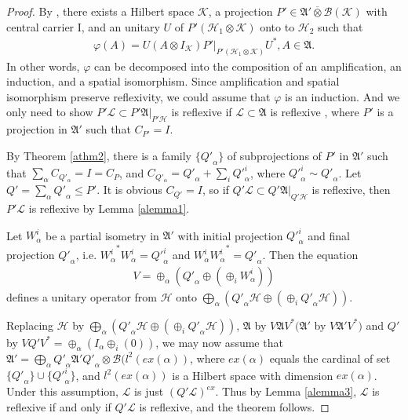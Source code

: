\documentclass{amsart}
\newcommand{\AAA}{\mathfrak A}
\newcommand{\B}{\mathcal B}
\newcommand{\HHH}{\mathcal H} %
\newcommand{\KKK}{\mathcal K} %
\newcommand{\LLL}{\mathcal L} %
\begin{document}
\begin{proof}
By \cite[Theorem 5.5]{Ta}, there exists a Hilbert space $\KKK$, a projection $P' \in \AAA' \overline{\otimes} \B(\KKK)$ with central carrier I, and 
an unitary $U$ of $P'(\HHH_1 \otimes \KKK)$ onto to $\HHH_2$ such that 
\begin{align*}
\varphi(A) = U(A \otimes I_{\KKK})P'|_{P'(\HHH_1\otimes \KKK)}U^{*}, A \in \AAA.
\end{align*} 
In other words, $\varphi$ can be decomposed into the composition of an amplification, an induction, and a spatial 
isomorphism. Since amplification and spatial isomorphism preserve reflexivity, we could assume that $\varphi$ is an 
induction. And we only need to show $P'\LLL \subset P'\AAA|_{P'\HHH}$ is reflexive if $\LLL \subset \AAA$ is reflexive
, where $P'$ is a projection in $\AAA'$ such that $C_{P'} = I$.

By Theorem \ref{athm2},  there is a family $\{{Q'}_{\alpha} \}$ of subprojections of $P'$ in $\AAA'$ such that
$\sum_{\alpha}C_{{Q'}_{\alpha}} = I = C_{P}$, and $C_{{Q'}_\alpha} = {Q'}_\alpha + \sum_{i}{Q'}_{\alpha}^{i}$, 
where ${Q'}_{\alpha}^{i} \sim {Q'}_{\alpha}$. Let $Q' = \sum_\alpha {Q'}_{\alpha} \leq P'$. It is obvious $C_{Q'} = I$, so
if $Q'\LLL \subset Q' \AAA |_{Q' \HHH}$ is reflexive, 
then $P'\LLL$ is reflexive  by Lemma \ref{alemma1}. 

Let $W^{i}_{\alpha}$ be a partial isometry in $\AAA'$ with initial projection ${Q'}^{i}_{\alpha}$ and final projection ${Q'}_{\alpha}$, i.e. 
${W^{i}_{\alpha}}^{*} W^{i}_{\alpha} = {Q'}^{i}_{\alpha}$ and $W^{i}_{\alpha} {W^{i}_{\alpha}}^{*} = {Q'}_{\alpha}$. Then the 
equation
\begin{align*}
V  = \oplus_{\alpha} ({Q'}_{\alpha} \oplus (\oplus_{i}W^{i}_{\alpha}))
\end{align*} 
defines a unitary operator from $\HHH$ onto $ \bigoplus_{\alpha}({Q'}_{\alpha}\HHH \oplus (\oplus_{i}{Q'}_{\alpha}\HHH))$.

Replacing $\HHH$ by $\bigoplus_{\alpha}({Q'}_{\alpha}\HHH \oplus (\oplus_{i}{Q'}_{\alpha}\HHH))$,
$\AAA$ by $V\AAA V^{*}$$(\AAA'$ by $V\AAA' V^{*})$ and $Q'$ by $VQ'V^{*} = \oplus_{\alpha} (I_{\alpha} \oplus_{i} (0)) $, we may now assume that $\AAA' = \bigoplus_{\alpha} {Q'}_{\alpha}\AAA' {Q'}_{\alpha} \otimes \B(l^2(ex(\alpha))$,
where $ex(\alpha)$ equals the cardinal of  set $\{ {Q'}_{\alpha} \} \cup \{ {Q'}_{\alpha}^{i} \}$, and $l^2(ex(\alpha))$ is a Hilbert space with dimension $ex(\alpha)$. 
Under this assumption, $\LLL$ is just $ (Q' \LLL)^{ex}$. Thus 
by Lemma \ref{alemma3}, $\LLL$ is reflexive if and only if $Q'\LLL$ is reflexive, and the theorem follows.
\end{proof}
\end{document}

